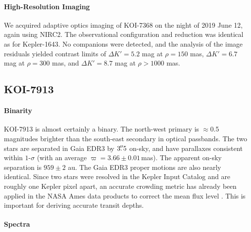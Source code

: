 \documentclass[12pt,twocolumn,linenumbers]{aastex63}
\begin{document}
\paragraph{High-Resolution Imaging}
We acquired adaptive optics imaging of KOI-7368 on the night of 2019
June 12, again using NIRC2.  The
observational configuration and reduction was identical as for
Kepler-1643.  No companions were detected, and the analysis of the
image residuals yielded contrast limits of $\Delta K' = 5.2$ mag at
$\rho = 150$ mas, $\Delta K' = 6.7$ mag at $\rho = 300$ mas, and
$\Delta K' = 8.7$ mag at $\rho > 1000$ mas.


\subsection{KOI-7913}

\paragraph{Binarity}

KOI-7913 is almost certainly a binary. %
The north-west primary is $\approx$0.5 magnitudes brighter than the
south-east secondary in optical passbands.  The two stars are
separated in Gaia EDR3 by $3\mbox{$.\!\!^{\prime\prime}$}5$ on-sky, and have parallaxes
consistent within $1$-$\sigma$ (with an average $\varpi=3.66 \pm
0.01$\,mas).  The apparent on-sky separation is
$959 \pm 2$ au.  
The Gaia EDR3 proper motions are also nearly identical.
Since two stars were resolved
in the Kepler Input Catalog and are roughly one Kepler pixel apart, an
accurate crowding metric has already been applied in the NASA Ames
data products to correct the mean flux level
\citep{2017ksci.rept....6M}.  This is important for deriving accurate
transit depths.

\paragraph{Spectra}
\end{document}
